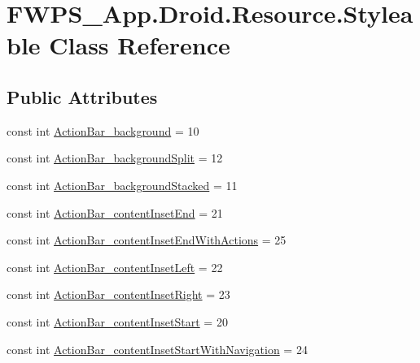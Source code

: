 \hypertarget{class_f_w_p_s___app_1_1_droid_1_1_resource_1_1_styleable}{}\section{F\+W\+P\+S\+\_\+\+App.\+Droid.\+Resource.\+Styleable Class Reference}
\label{class_f_w_p_s___app_1_1_droid_1_1_resource_1_1_styleable}
\subsection*{Public Attributes}
\begin{DoxyCompactItemize}
\item 
const int \mbox{\hyperlink{class_f_w_p_s___app_1_1_droid_1_1_resource_1_1_styleable_a39e1164adf59598deef27c9278821d26}{Action\+Bar\+\_\+background}} = 10
\item 
const int \mbox{\hyperlink{class_f_w_p_s___app_1_1_droid_1_1_resource_1_1_styleable_a421fff7922cb1300265004f83e2093f9}{Action\+Bar\+\_\+background\+Split}} = 12
\item 
const int \mbox{\hyperlink{class_f_w_p_s___app_1_1_droid_1_1_resource_1_1_styleable_a7cedd5d98135272b98b50d22e613e7c4}{Action\+Bar\+\_\+background\+Stacked}} = 11
\item 
const int \mbox{\hyperlink{class_f_w_p_s___app_1_1_droid_1_1_resource_1_1_styleable_ae02a6613adfac7df3fddef5c39cbfd50}{Action\+Bar\+\_\+content\+Inset\+End}} = 21
\item 
const int \mbox{\hyperlink{class_f_w_p_s___app_1_1_droid_1_1_resource_1_1_styleable_a194af882d995a04657f30a1acc73c690}{Action\+Bar\+\_\+content\+Inset\+End\+With\+Actions}} = 25
\item 
const int \mbox{\hyperlink{class_f_w_p_s___app_1_1_droid_1_1_resource_1_1_styleable_aefa3447374b211b919ae79243489b883}{Action\+Bar\+\_\+content\+Inset\+Left}} = 22
\item 
const int \mbox{\hyperlink{class_f_w_p_s___app_1_1_droid_1_1_resource_1_1_styleable_a9e6afb2e7598c00e20b704c8167cb122}{Action\+Bar\+\_\+content\+Inset\+Right}} = 23
\item 
const int \mbox{\hyperlink{class_f_w_p_s___app_1_1_droid_1_1_resource_1_1_styleable_ae74e07866c33f28b92754e22b034fabc}{Action\+Bar\+\_\+content\+Inset\+Start}} = 20
\item 
const int \mbox{\hyperlink{class_f_w_p_s___app_1_1_droid_1_1_resource_1_1_styleable_a4e5823f448adc4e23f37726fe2ae06ee}{Action\+Bar\+\_\+content\+Inset\+Start\+With\+Navigation}} = 24

\end{DoxyCompactItemize}
